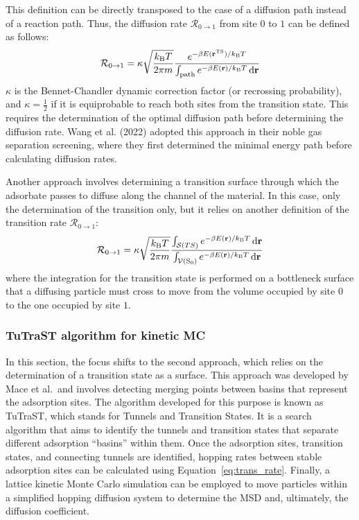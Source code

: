 \documentclass[main]{subfiles}
\begin{document}
This definition can be directly transposed to the case of a diffusion path instead of a reaction path. Thus, the diffusion rate $\mathcal{R}_{0\rightarrow 1}$ from site $0$ to $1$ can be defined as follows:
\begin{equation}\label{eq:trans_rate_path}
  \mathcal{R}_{0\rightarrow 1} = \kappa\sqrt{\frac{k_{\text{B}}T}{2\pi m}}\frac{e^{-\beta E(\mathbf{r}^{\text{TS}})/k_{\text{B}}T}}{\int_{\text{path}}e^{-\beta E(\mathbf{r})/k_{\text{B}}T}\mathop{}\mathopen{}\mathrm{d}\mathbf{r}}
\end{equation}
$\kappa$ is the Bennet-Chandler dynamic correction factor (or recrossing probability),\autocite{BENNETT1977} and $\kappa=\tfrac{1}{2}$ if it is equiprobable to reach both sites from the transition state. This requires the determination of the optimal diffusion path before determining the diffusion rate. Wang et al. (2022) adopted this approach in their noble gas separation screening, where they first determined the minimal energy path before calculating diffusion rates.\autocite{Wang_2022}

Another approach involves determining a transition surface through which the adsorbate passes to diffuse along the channel of the material. In this case, only the determination of the transition only, but it relies on another definition of the transition rate $\mathcal{R}_{0\rightarrow 1}$:
\begin{equation}\label{eq:trans_rate}
  \mathcal{R}_{0\rightarrow 1} = \kappa\sqrt{\frac{k_{\text{B}}T}{2\pi m}}\frac{\int_{\mathcal{S}(TS)}e^{-\beta E(\mathbf{r})/k_{\text{B}}T}\mathop{}\mathopen{}\mathrm{d}\mathbf{r}}{\int_{\mathcal{V}(\text{S}_0)}e^{-\beta E(\mathbf{r})/k_{\text{B}}T}\mathop{}\mathopen{}\mathrm{d}\mathbf{r}}
\end{equation}
where the integration for the transition state is performed on a bottleneck surface that a diffusing particle must cross to move from the volume occupied by site $0$ to the one occupied by site $1$.

\subsubsection{TuTraST algorithm for kinetic MC}\label{sct:tutrast}

In this section, the focus shifts to the second approach, which relies on the determination of a transition state as a surface. This approach was developed by Mace et al.\autocite{Mace_2019}\ and involves detecting merging points between basins that represent the adsorption sites. The algorithm developed for this purpose is known as TuTraST,  which stands for Tunnels and Transition States. It is a search algorithm that aims to identify the tunnels and transition states that separate different adsorption ``basins'' within them. Once the adsorption sites, transition states, and connecting tunnels are identified, hopping rates between stable adsorption sites can be calculated using Equation~\ref{eq:trans_rate}. Finally, a lattice kinetic Monte Carlo simulation can be employed to move particles within a simplified hopping diffusion system to determine the MSD and, ultimately, the diffusion coefficient.
\end{document}
